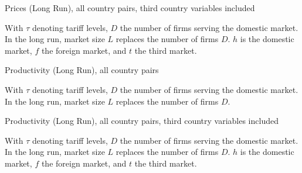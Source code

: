 \renewcommand{\arraystretch}{1}
\begin{table}[h!b]
\tiny
\begin{center}\caption{Prices (Long Run), all country pairs, third country
variables included\label{tb:prices_lr_third}}

\end{center}
\end{table}
With $\tau$ denoting tariff levels, $D$ the number of firms serving the domestic market. 
In the long run, market size $L$ replaces the number of firms $D$. 
$h$ is the domestic market, $f$ the foreign market, and $t$ the third market.
\clearpage

\begin{table}[h!b]
\tiny
\begin{center}\caption{Productivity (Long Run), all country pairs\label{tb:productivity_lr}}

\end{center}
\end{table}
With $\tau$ denoting tariff levels, $D$ the number of firms serving the domestic market. 
In the long run, market size $L$ replaces the number of firms $D$. 
\clearpage

\begin{table}[h!b]
\tiny
\begin{center}\caption{Productivity (Long Run), all country pairs, third country 
variables included\label{tb:productivity_lr_third}}

\end{center}
\end{table}
With $\tau$ denoting tariff levels, $D$ the number of firms serving the domestic market. 
In the long run, market size $L$ replaces the number of firms $D$. 
$h$ is the domestic market, $f$ the foreign market, and $t$ the third market.

